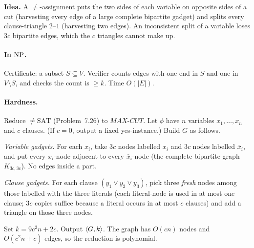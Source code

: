 \begin{soln}
\textbf{Idea.} A $\neq$-assignment puts the two sides of each variable on opposite sides of a cut (harvesting every edge of a large complete bipartite gadget) and splits every clause-triangle $2$--$1$ (harvesting two edges). An inconsistent split of a variable loses $3c$ bipartite edges, which the $c$ triangles cannot make up.

\paragraph{In $\mathrm{NP}$.}
Certificate: a subset $S\subseteq V$. Verifier counts edges with one end in $S$ and one in $V\setminus S$, and checks the count is $\ge k$. Time $O(|E|)$.

\paragraph{Hardness.}
Reduce $\neq\mathrm{SAT}$ (Problem~7.26) to $\mathit{MAX\text{-}CUT}$. Let $\phi$ have $n$ variables $x_1,\dots,x_n$ and $c$ clauses. (If $c=0$, output a fixed yes-instance.) Build $G$ as follows.

\emph{Variable gadgets.} For each $x_i$, take $3c$ nodes labelled $x_i$ and $3c$ nodes labelled $\overline{x}_i$, and put every $x_i$-node adjacent to every $\overline{x}_i$-node (the complete bipartite graph $K_{3c,3c}$). No edges inside a part.

\emph{Clause gadgets.} For each clause $(y_1\lor y_2\lor y_3)$, pick three \emph{fresh} nodes among those labelled with the three literals (each literal-node is used in at most one clause; $3c$ copies suffice because a literal occurs in at most $c$ clauses) and add a triangle on those three nodes.

Set $k=9c^2 n+2c$. Output $\langle G,k\rangle$. The graph has $O(cn)$ nodes and $O(c^2 n+c)$ edges, so the reduction is polynomial.

\begin{center}


\end{center}
\end{soln}
